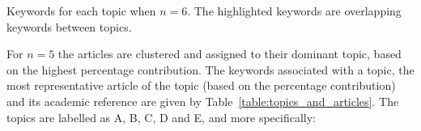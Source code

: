 \begin{table}[!hbtp]
    \begin{center}
    \resizebox{\textwidth}{!}{
    }
    \end{center}
    \caption{Keywords for each topic when \(n=6\). The highlighted keywords are overlapping keywords between topics.}
    \label{table:topics_keywords_n_6}
\end{table}

For \(n=5\) the articles are clustered and assigned to their dominant topic,
based on the highest percentage contribution. The keywords associated with a
topic, the most representative article of the topic (based on the
percentage contribution) and its academic reference are given by
Table~\ref{table:topics_and_articles}. The topics are labelled as A, B, C, D and
E, and more specifically:

